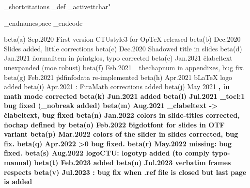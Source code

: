 \_shortcitations
\_def
\_activettchar"

\_endnamespace %
\_endcode


beta(a) Sep.2020  First version CTUstyle3 for OpTeX released
beta(b) Dec.2020  Slides added, little corrections
beta(c) Dec.2020  Shadowed title in slides
beta(d) Jan.2021  \.normalitem in \.printglos, typo corrected
beta(e) Jan.2021  \.clabeltext unexpanded (moe robust)
beta(f) Feb.2021  \_thechapnum in appendixes, bug fix.
beta(g) Feb.2021  \.pdfinfodata re-implemented
beta(h) Apr.2021  \.bLaTeX logo added
beta(i) Apr.2021  \slides: FiraMath corrections added
beta(j) May 2021  \bf, \bi in math mode corrected
beta(k) Jun.2021  \oddchapters added
beta(l) Jul.2021  \_tocl:1 bug fixed (\_nobreak added)
beta(m) Aug.2021  \_clabeltext -> \.clabeltext, bug fixed
beta(n) Jan.2022  colors in slide-titles corrected, \.nochap defined by \eoldef
beta(o) Feb.2022  \.bigdotfont for slides in OTF variant
beta(p) Mar.2022  colors of the slider in slides corrected, bug fix.
beta(q) Apr.2022  \ttline>0 bug fixed.
beta(r) May.2022  \shiftoffset missing: bug fixed.
beta(s) Aug.2022  logoCTU: logotyp added (to comply typo-manual)
beta(t) Feb.2023  \fnumbering added
beta(u) Jul.2023  verbatim frames respects \leftskip
beta(v) Jul.2023  \draft: bug fix when .ref file is closed but last page is added
